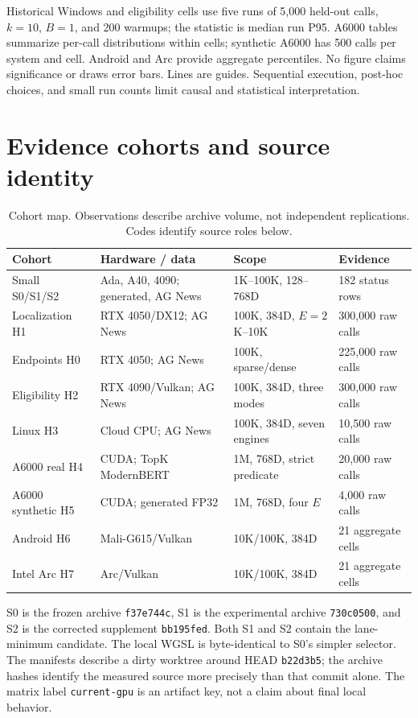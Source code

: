 \documentclass[10pt]{article}
\begin{document}
Historical Windows and eligibility cells use five runs of 5,000 held-out calls, $k=10$, $B=1$, and 200 warmups; the statistic is median run P95. A6000 tables summarize per-call distributions within cells; synthetic A6000 has 500 calls per system and cell. Android and Arc provide aggregate percentiles. No figure claims significance or draws error bars. Lines are guides. Sequential execution, post-hoc choices, and small run counts limit causal and statistical interpretation.

\section{Evidence cohorts and source identity}\label{sec:cohorts}
\begin{table}[H]\centering\small
\caption{Cohort map. Observations describe archive volume, not independent replications. Codes identify source roles below.}
\begin{tabular}{L{.24\linewidth}L{.23\linewidth}L{.22\linewidth}L{.19\linewidth}}
\toprule Cohort & Hardware / data & Scope & Evidence \\
\midrule
Small S0/S1/S2 & Ada, A40, 4090; generated, AG News & 1K--100K, 128--768D & 182 status rows \\
Localization H1 & RTX 4050/DX12; AG News & 100K, 384D, $E=2$K--10K & 300,000 raw calls \\
Endpoints H0 & RTX 4050; AG News & 100K, sparse/dense & 225,000 raw calls \\
Eligibility H2 & RTX 4090/Vulkan; AG News & 100K, 384D, three modes & 300,000 raw calls \\
Linux H3 & Cloud CPU; AG News & 100K, 384D, seven engines & 10,500 raw calls \\
A6000 real H4 & CUDA; TopK ModernBERT & 1M, 768D, strict predicate & 20,000 raw calls \\
A6000 synthetic H5 & CUDA; generated FP32 & 1M, 768D, four $E$ & 4,000 raw calls \\
Android H6 & Mali-G615/Vulkan & 10K/100K, 384D & 21 aggregate cells \\
Intel Arc H7 & Arc/Vulkan & 10K/100K, 384D & 21 aggregate cells \\
\bottomrule\end{tabular}\end{table}
S0 is the frozen archive \texttt{f37e744c}, S1 is the experimental archive \texttt{730c0500}, and S2 is the corrected supplement \texttt{bb195fed}. Both S1 and S2 contain the lane-minimum candidate. The local WGSL is byte-identical to S0's simpler selector. The manifests describe a dirty worktree around HEAD \texttt{b22d3b5}; the archive hashes identify the measured source more precisely than that commit alone. The matrix label \texttt{current-gpu} is an artifact key, not a claim about final local behavior.
\end{document}
